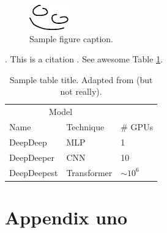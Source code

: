 \documentclass[twocolumn]{article}
\begin{document}
\lipsum[5]

\begin{figure}[t!]
	\centering
	\includegraphics[width=0.30\linewidth]{happy}
	\caption{Sample figure caption.}
	\label{fig:fig1}
\end{figure}

\lipsum[6]. This is a citation \citep{kingma2014adam, vaswani2017attention}. See awesome Table \ref{tab:table}.

\begin{table}[t!]
	\caption{Sample table title. Adapted from \citet{devlin2018bert} (but not really).}
	\centering
	\begin{tabular}{lll}
		\toprule
		\multicolumn{2}{c}{Model}                   \\
		\cmidrule(r){1-2}
		Name     & Technique     & \# GPUs \\
		\midrule
		DeepDeep & MLP  & 1     \\
		DeepDeeper     & CNN & 10      \\
		DeepDeepest     & Transformer       & $\sim10^6$  \\
		\bottomrule
	\end{tabular}
	\label{tab:table}
\end{table}




\appendix

\section{Appendix uno}
\lipsum[8]
\end{document}
